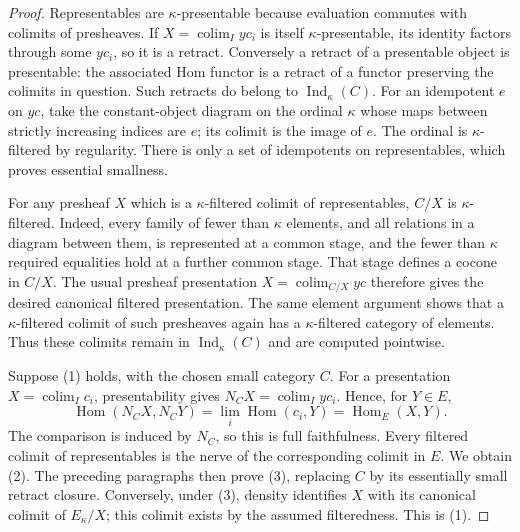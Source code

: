 \begin{proof}
Representables are $\kappa$-presentable because evaluation commutes with
colimits of presheaves.  If $X=\operatorname{colim}_I yc_i$ is itself
$\kappa$-presentable, its identity factors through some $yc_i$, so it is
a retract.  Conversely a retract of a presentable object is presentable:
the associated Hom functor is a retract of a functor preserving the
colimits in question.  Such retracts do belong to
$\operatorname{Ind}_\kappa(C)$.  For an idempotent $e$ on $yc$, take the
constant-object diagram on the ordinal $\kappa$ whose maps between
strictly increasing indices are $e$; its colimit is the image of $e$.
The ordinal is $\kappa$-filtered by regularity.  There is only a set of
idempotents on representables, which proves essential smallness.

For any presheaf $X$ which is a $\kappa$-filtered colimit of
representables, $C/X$ is $\kappa$-filtered.  Indeed, every family of
fewer than $\kappa$ elements, and all relations in a diagram between
them, is represented at a common stage, and the fewer than $\kappa$
required equalities hold at a further common stage.  That stage defines
a cocone in $C/X$.  The usual presheaf presentation
$X=\operatorname{colim}_{C/X}yc$ therefore gives the desired canonical
filtered presentation.  The same element argument shows that a
$\kappa$-filtered colimit of such presheaves again has a
$\kappa$-filtered category of elements.  Thus these colimits remain in
$\operatorname{Ind}_\kappa(C)$ and are computed pointwise.

Suppose (1) holds, with the chosen small category $C$.  For a
presentation $X=\operatorname{colim}_I c_i$, presentability gives
$N_CX=\operatorname{colim}_I yc_i$.  Hence, for $Y\in E$,
\[
 \operatorname{Hom}(N_CX,N_CY)
 =\lim_i\operatorname{Hom}(c_i,Y)
 =\operatorname{Hom}_E(X,Y).
\]
The comparison is induced by $N_C$, so this is full faithfulness.
Every filtered colimit of representables is the nerve of the
corresponding colimit in $E$.  We obtain (2).  The preceding paragraphs
then prove (3), replacing $C$ by its essentially small retract closure.
Conversely, under (3), density identifies $X$ with its canonical colimit
of $E_\kappa/X$; this colimit exists by the assumed filteredness.
This is (1).


\end{proof}
